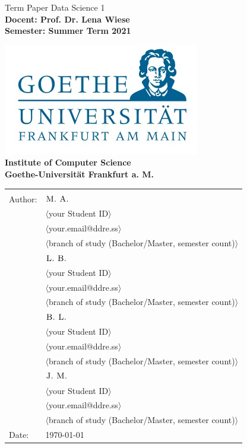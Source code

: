 \begin{center}

  {\Huge {
  Term Paper Data Science 1}
  }
  \\[2ex]
  
  \textbf{
  \Large 
  Docent: Prof. Dr. Lena Wiese \\ 
  Semester: Summer Term 2021\\  
  }
  
  
  
  \includegraphics[scale=0.4]{images/logo.jpg} \\ 
  \large{\textbf{Institute of Computer Science \\ Goethe-Universit\"at Frankfurt a. M.}}
  
  
  
  \begin{normalsize}
  \begin{tabular}{ll}
  & \\
  Author: & $\textsc{M. A.}$ \\
  & $\langle$your Student ID$\rangle$\\
  & $\langle$your.email@ddre.ss$\rangle$ \\
  & $\langle$branch of study (Bachelor/Master, semester count)$\rangle$ \\
  & $\textsc{L. B.}$ \\
  & $\langle$your Student ID$\rangle$\\
  & $\langle$your.email@ddre.ss$\rangle$ \\
  & $\langle$branch of study (Bachelor/Master, semester count)$\rangle$ \\
  & $\textsc{B. L.}$ \\
  & $\langle$your Student ID$\rangle$\\
  & $\langle$your.email@ddre.ss$\rangle$ \\
  & $\langle$branch of study (Bachelor/Master, semester count)$\rangle$ \\
  & $\textsc{J. M.}$ \\
  & $\langle$your Student ID$\rangle$\\
  & $\langle$your.email@ddre.ss$\rangle$ \\
  & $\langle$branch of study (Bachelor/Master, semester count)$\rangle$ \\
  Date: & \today \\		
  \end{tabular}
  \end{normalsize}
  
  \end{center}
  
